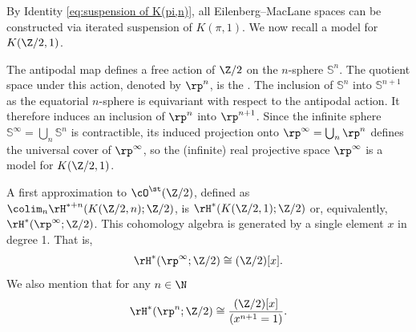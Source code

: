 %


\subsubsection{} By Identity \eqref{eq:suspension of K(pi,n)}, all Eilenberg--MacLane spaces can be constructed via iterated suspension of $K(\pi,1)$.
We now recall a model for $K(\Z/2, 1)$.

The antipodal map defines a free action of $\Z/2$ on the $n$-sphere \(\mathbb{S}^n\).
The quotient space under this action, denoted by \(\rp^n\), is the .
The inclusion of \(\mathbb{S}^n\) into \(\mathbb{S}^{n+1}\) as the equatorial $n$-sphere is equivariant with respect to the antipodal action.
It therefore induces an inclusion of \(\rp^n\) into \(\rp^{n+1}\).
Since the infinite sphere \(\mathbb{S}^\infty = \bigcup_n \mathbb{S}^n\) is contractible, its induced projection onto $\rp^\infty = \bigcup_n \rp^n$ defines the universal cover of \(\rp^\infty\), so the (infinite) real projective space $\rp^\infty$ is a model for \(K(\Z/2, 1)\).

A first approximation to $\cO^\st(\Z/2)$, defined as $\colim_n \rH^{\ast + n}(K(\Z/2, n); \Z/2)$, is $\rH^\ast(K(\Z/2, 1); \Z/2)$ or, equivalently, $\rH^\ast(\rp^\infty; \Z/2)$.
This cohomology algebra is generated by a single element $x$ in degree 1.
That is,
\[
\rH^\ast(\rp^\infty; \Z/2) \cong (\Z/2)[x].
\]
We also mention that for any $n \in \N$
\[
\rH^\ast(\rp^n; \Z/2) \cong \frac{(\Z/2)[x]}{(x^{n+1} = 1)}.
\]

